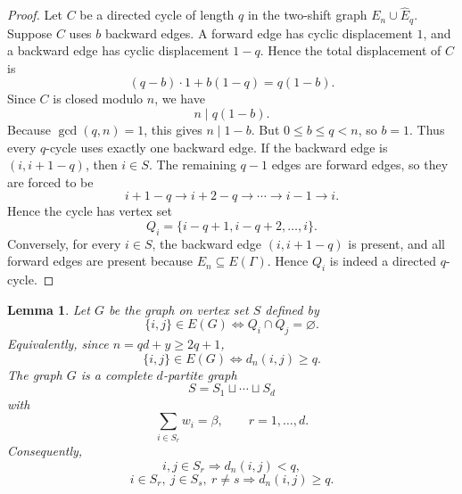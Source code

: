 \documentclass[11pt]{article}
\numberwithin{equation}{section}
\newtheorem{lemma}[theorem]{Lemma}
\newcommand{\Ehat}{\widehat E_q}
\begin{document}
\begin{proof}
Let $C$ be a directed cycle of length $q$ in the two-shift graph
$E_n\cup\Ehat$. Suppose $C$ uses $b$ backward edges. A forward edge has cyclic
displacement $1$, and a backward edge has cyclic displacement $1-q$. Hence the
total displacement of $C$ is
\[
        (q-b)\cdot1+b(1-q)=q(1-b).
\]
Since $C$ is closed modulo $n$, we have
\[
        n\mid q(1-b).
\]
Because $\gcd(q,n)=1$, this gives $n\mid1-b$. But $0\le b\le q<n$, so
$b=1$. Thus every $q$-cycle uses exactly one backward edge. If the backward
edge is $(i,i+1-q)$, then $i\in S$. The remaining $q-1$ edges are forward
edges, so they are forced to be
\[
        i+1-q\to i+2-q\to\cdots\to i-1\to i.
\]
Hence the cycle has vertex set
\[
        Q_i=\{i-q+1,i-q+2,\ldots,i\}.
\]
Conversely, for every $i\in S$, the backward edge $(i,i+1-q)$ is present, and
all forward edges are present because $E_n\subseteq E(\Gamma)$. Hence $Q_i$ is
indeed a directed $q$-cycle.
\end{proof}

\begin{lemma}\label{lem:turan-step}
Let $G$ be the graph on vertex set $S$ defined by
\[
        \{i,j\}\in E(G)\Longleftrightarrow Q_i\cap Q_j=\varnothing.
\]
Equivalently, since $n=qd+y\ge2q+1$,
\begin{equation}
        \{i,j\}\in E(G) \Longleftrightarrow d_n(i,j)\ge q. \label{eq:dist}
\end{equation}
The graph $G$ is a complete $d$-partite graph
\[
        S=S_1\sqcup\cdots\sqcup S_d
\]
with
\[
        \sum_{i\in S_r}w_i=\beta,\qquad r=1,\ldots,d.
\]
Consequently,
\[
        i,j\in S_r \Longrightarrow d_n(i,j)<q,
\]
\[
        i\in S_r,\ j\in S_s,\ r\ne s \Longrightarrow d_n(i,j)\ge q.
\]
\end{lemma}
\end{document}
